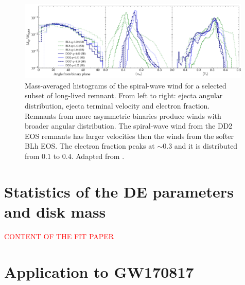 \documentclass[11pt,a4paper,headinclude=true,DIV=14,BCOR=8mm,chapterprefix,listof=totoc,twoside,openright,abstracton]{scrbook}
\newcommand{\red}[1]{\textcolor{red}{#1}}
\newcommand{\swind}{spiral-wave wind}
\newcommand{\GW}{GW170817}
\begin{document}
\begin{figure}[t]
    \centering 
    \includegraphics[width=0.99\textwidth]{./figs/ejecta_postdyn/wind_hists_shared.pdf}
    \caption{Mass-averaged histograms of the \swind{} for a selected
        subset of long-lived remnant. From left to right: ejecta angular
        distribution, ejecta terminal velocity and electron
        fraction. Remnants from more asymmetric binaries produce winds
        with broader angular distribution.
        The \swind{} from the DD2 EOS remnants has larger velocities
        then the winds from the softer BLh EOS. The electron fraction
        peaks at ${\sim}0.3$ and it is distributed from $0.1$ to $0.4$.
        Adapted from \citet{Nedora:2020pak}.
    }
    \label{fig:ejecta:bern:hist}
\end{figure}





\section{Statistics of the \ac{DE} parameters and disk mass}

\red{CONTENT OF THE FIT PAPER}


\section{Application to \GW{}}
\end{document}
